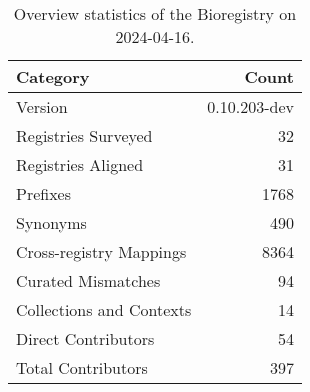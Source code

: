 \begin{table}
\centering
\caption{Overview statistics of the Bioregistry on 2024-04-16.}
\label{tab:bioregistry-summary}
\begin{tabular}{lr}
\toprule
                Category &        Count \\
\midrule
                 Version & 0.10.203-dev \\
     Registries Surveyed &           32 \\
      Registries Aligned &           31 \\
                Prefixes &         1768 \\
                Synonyms &          490 \\
 Cross-registry Mappings &         8364 \\
      Curated Mismatches &           94 \\
Collections and Contexts &           14 \\
     Direct Contributors &           54 \\
      Total Contributors &          397 \\
\bottomrule
\end{tabular}
\end{table}
